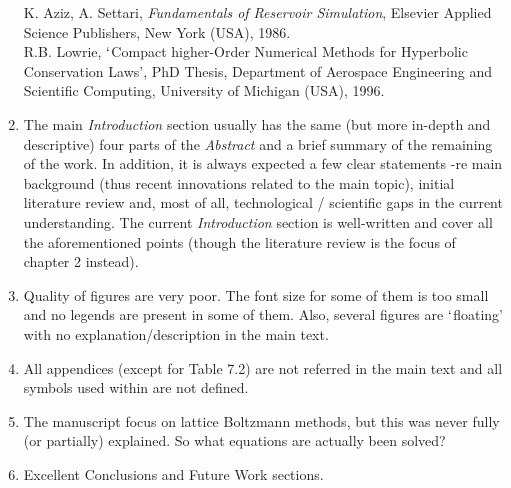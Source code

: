 \documentclass[14pt,twoside]{report}
\begin{document}
\begin{enumerate}
\noindent
[41] K. Aziz, A. Settari, {\it Fundamentals of Reservoir Simulation}, Elsevier Applied Science Publishers, New York (USA), 1986.\\
\noindent
[42] R.B. Lowrie, $\lq$Compact higher-Order Numerical Methods for Hyperbolic Conservation Laws', PhD Thesis, Department of Aerospace Engineering and Scientific Computing, University of Michigan (USA), 1996.
%
\item The main {\it Introduction} section usually has the same (but more in-depth and descriptive) four parts of the {\it Abstract} and a brief summary of the remaining of the work. In addition, it is always expected a few clear statements -re main background (thus recent innovations related to the main topic), initial literature review and, most of all, technological / scientific gaps in the current understanding. The current {\it Introduction} section is well-written and cover all the aforementioned points (though the literature review is the focus of chapter 2 instead). %
%
\item Quality of figures are very poor. The font size for some of them is too small and no legends are present in some of them. Also, several figures are $\lq$floating' with no explanation/description in the main text.
%
\item All appendices (except for Table 7.2) are not referred in the main text and all symbols used within are not defined.
%
\item The manuscript focus on lattice Boltzmann methods, but this was never fully (or partially) explained. So what equations are actually been solved?
%
\item Excellent Conclusions and Future Work sections.
%
%
\end{enumerate}
\end{document}
